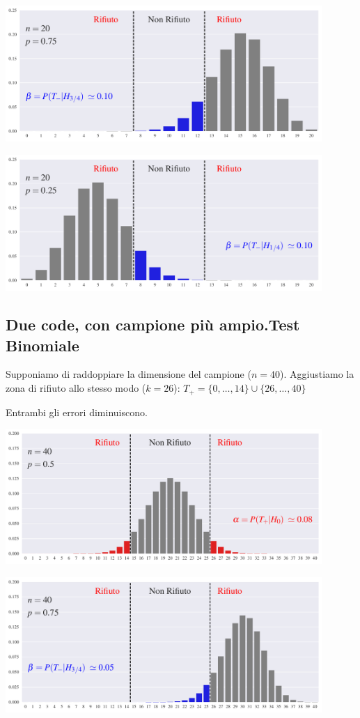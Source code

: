 \documentclass[10pt,openany]{book}
\theoremstyle{mio}
\theoremstyle{liscio}
\begin{document}
\hfil\includegraphics[width=0.9\textwidth]{figure/B-test_05.pdf}

\hfil\includegraphics[width=0.9\textwidth]{figure/B-test_06.pdf}





\clearpage\subsection{Due code, con campione più ampio.\hfill Test Binomiale}

Supponiamo di raddoppiare la dimensione del campione ($n=40$). Aggiustiamo la zona di rifiuto allo stesso modo ($k=26$):  $T_+=\{0,\dots,14\}\cup \{26,\dots,40\}$

Entrambi gli errori diminuiscono.


\hfil\includegraphics[width=0.9\textwidth]{figure/B-test_07.pdf}

\hfil\includegraphics[width=0.9\textwidth]{figure/B-test_08.pdf}
\end{document}

